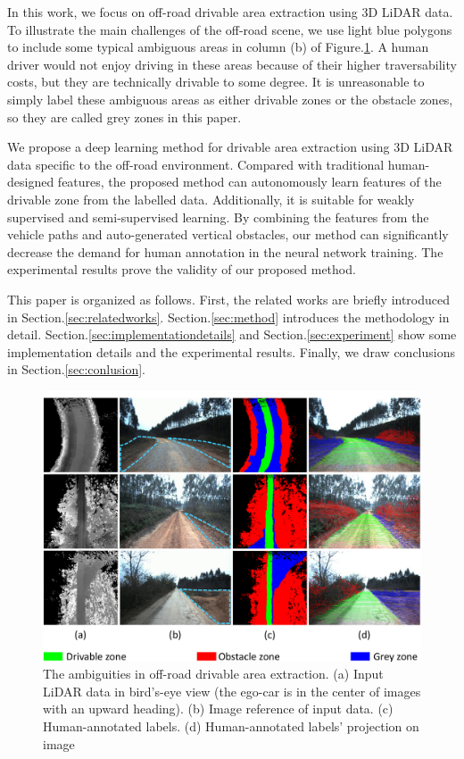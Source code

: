 \documentclass[letterpaper, 10 pt, conference]{ieeeconf}  %
\begin{document}
In this work, we focus on off-road drivable area extraction using 3D LiDAR data. To illustrate the main challenges of the off-road scene, we use light blue polygons to include some typical ambiguous areas in column (b) of Figure.\ref{fig:example}. A human driver would not enjoy driving in these areas because of their higher traversability costs, but they are technically drivable to some degree. It is unreasonable to simply label these ambiguous areas as either drivable zones or the obstacle zones, so they are called grey zones in this paper.

We propose a deep learning method for drivable area extraction using 3D LiDAR data specific to the off-road environment. Compared with traditional human-designed features, the proposed method can autonomously learn features of the drivable zone from the labelled data. Additionally, it is suitable for weakly supervised and semi-supervised learning. By combining the features from the vehicle paths and auto-generated vertical obstacles, our method can significantly decrease the demand for human annotation in the neural network training. The experimental results prove the validity of our proposed method.

This paper is organized as follows. First, the related works are briefly introduced in Section.\ref{sec:relatedworks}. Section.\ref{sec:method} introduces the methodology in detail. Section.\ref{sec:implementationdetails} and Section.\ref{sec:experiment} show some implementation details and the experimental results. Finally, we draw conclusions in Section.\ref{sec:conlusion}.

\begin{figure}[t]
	\centering
	\includegraphics[scale=0.17]{offRoadExample.pdf}
	\caption{The ambiguities in off-road drivable area extraction. (a) Input LiDAR data in bird's-eye view (the ego-car is in the center of images with an upward heading). (b) Image reference of input data. (c) Human-annotated labels. (d) Human-annotated labels' projection on image}
	\label{fig:example}
	\vspace{-3mm}
\end{figure}
\end{document}
